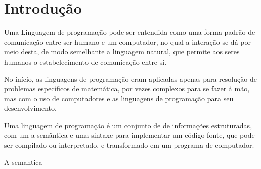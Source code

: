 \chapter[Introdução]{Introdução}

Uma Linguagem de programação pode ser entendida como uma forma padrão de comunicação entre ser humano e um computador, no qual a interação se dá por meio desta, de modo semelhante a linguagem  natural, que permite aos seres humanos o estabelecimento de comunicação entre si.

No início, as linguagens de programação eram aplicadas apenas para resolução de problemas específicos de matemática, por vezes complexos para se fazer á mão, mas com o uso de computadores e as linguagens de programação para seu desenvolvimento.

Uma linguagem de programação é um conjunto de de informações estruturadas, com um a semântica e uma sintaxe para implementar um código fonte, que pode ser compilado ou interpretado, e transformado em um programa de computador.

A semantica 